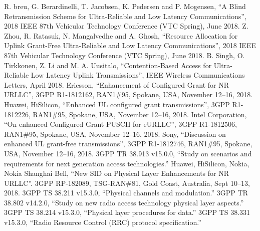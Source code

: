 \documentclass[conference]{IEEEtran}
\begin{document}
\begin{thebibliography}{00}
 R. breu, G. Berardinelli, T. Jacobsen, K. Pedersen and P. Mogensen, ``A Blind Retransmission Scheme for Ultra-Reliable and Low Latency Communications'', 2018 IEEE 87th Vehicular Technology Conference (VTC Spring), June 2018.
 Z. Zhou, R. Ratasuk, N. Mangalvedhe and A. Ghosh, ``Resource Allocation for Uplink Grant-Free Ultra-Reliable and Low Latency Communications'', 2018 IEEE 87th Vehicular Technology Conference (VTC Spring), June 2018.
 B. Singh, O. Tirkkonen, Z. Li and M. A. Uusitalo, ``Contention-Based Access for Ultra-Reliable Low Latency Uplink Transmissions'',  IEEE Wireless Communications Letters, April 2018.
 Ericsson, ``Enhancement of Configured Grant for NR URLLC'', 3GPP R1-1812162, RAN1\#95, Spokane, USA, November 12--16, 2018.
 Huawei, HiSilicon, ``Enhanced UL configured grant transmissions'', 3GPP R1-1812226, RAN1\#95, Spokane, USA, November 12--16, 2018.
 Intel Corporation, ``On enhanced Configured Grant PUSCH for eURLLC'', 3GPP R1-1812506, RAN1\#95, Spokane, USA, November 12--16, 2018.
 Sony, ``Discussion on enhanced UL grant-free transmissions'', 3GPP R1-1812746, RAN1\#95, Spokane, USA, November 12--16, 2018.
 3GPP TR 38.913 v15.0.0, ``Study on scenarios and requirements for next generation access technologies.''
 Huawei, HiSilicon, Nokia, Nokia Shanghai Bell, ``New SID on Physical Layer Enhancements for NR URLLC''. 3GPP RP-182089, TSG-RAN\#81, Gold Coast, Australia, Sept 10--13, 2018.
 3GPP TS 38.211 v15.3.0, ``Physical channels and modulation.''
 3GPP TR 38.802 v14.2.0, ``Study on new radio access technology physical layer aspects.''
 3GPP TS 38.214 v15.3.0, ``Physical layer procedures for data.''
 3GPP TS 38.331 v15.3.0, ``Radio Resource Control (RRC) protocol specification.''

\end{thebibliography}
\vspace{12pt}
\end{document}
